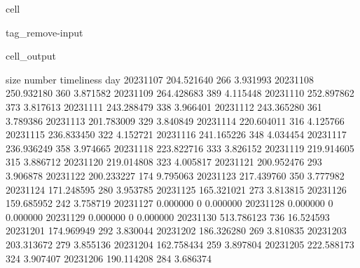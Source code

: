 \documentclass[letterpaper,10pt,english]{jupyterBook}
\begin{document}
\begin{sphinxuseclass}{cell}
\begin{sphinxuseclass}{tag_remove-input}\begin{sphinxVerbatimOutput}

\begin{sphinxuseclass}{cell_output}
\begin{sphinxVerbatim}[commandchars=\\\{\}]
                  size  number  timeliness
day                                       
2023\PYGZhy{}11\PYGZhy{}07  204.521640     266    3.931993
2023\PYGZhy{}11\PYGZhy{}08  250.932180     360    3.871582
2023\PYGZhy{}11\PYGZhy{}09  264.428683     389    4.115448
2023\PYGZhy{}11\PYGZhy{}10  252.897862     373    3.817613
2023\PYGZhy{}11\PYGZhy{}11  243.288479     338    3.966401
2023\PYGZhy{}11\PYGZhy{}12  243.365280     361    3.789386
2023\PYGZhy{}11\PYGZhy{}13  201.783009     329    3.840849
2023\PYGZhy{}11\PYGZhy{}14  220.604011     316    4.125766
2023\PYGZhy{}11\PYGZhy{}15  236.833450     322    4.152721
2023\PYGZhy{}11\PYGZhy{}16  241.165226     348    4.034454
2023\PYGZhy{}11\PYGZhy{}17  236.936249     358    3.974665
2023\PYGZhy{}11\PYGZhy{}18  223.822716     333    3.826152
2023\PYGZhy{}11\PYGZhy{}19  219.914605     315    3.886712
2023\PYGZhy{}11\PYGZhy{}20  219.014808     323    4.005817
2023\PYGZhy{}11\PYGZhy{}21  200.952476     293    3.906878
2023\PYGZhy{}11\PYGZhy{}22  200.233227     174    9.795063
2023\PYGZhy{}11\PYGZhy{}23  217.439760     350    3.777982
2023\PYGZhy{}11\PYGZhy{}24  171.248595     280    3.953785
2023\PYGZhy{}11\PYGZhy{}25  165.321021     273    3.813815
2023\PYGZhy{}11\PYGZhy{}26  159.685952     242    3.758719
2023\PYGZhy{}11\PYGZhy{}27    0.000000       0    0.000000
2023\PYGZhy{}11\PYGZhy{}28    0.000000       0    0.000000
2023\PYGZhy{}11\PYGZhy{}29    0.000000       0    0.000000
2023\PYGZhy{}11\PYGZhy{}30  513.786123     736   16.524593
2023\PYGZhy{}12\PYGZhy{}01  174.969949     292    3.830044
2023\PYGZhy{}12\PYGZhy{}02  186.326280     269    3.810835
2023\PYGZhy{}12\PYGZhy{}03  203.313672     279    3.855136
2023\PYGZhy{}12\PYGZhy{}04  162.758434     259    3.897804
2023\PYGZhy{}12\PYGZhy{}05  222.588173     324    3.907407
2023\PYGZhy{}12\PYGZhy{}06  190.114208     284    3.686374
\end{sphinxVerbatim}

\end{sphinxuseclass}\end{sphinxVerbatimOutput}

\end{sphinxuseclass}
\end{sphinxuseclass}
\sphinxstepscope
\end{document}
